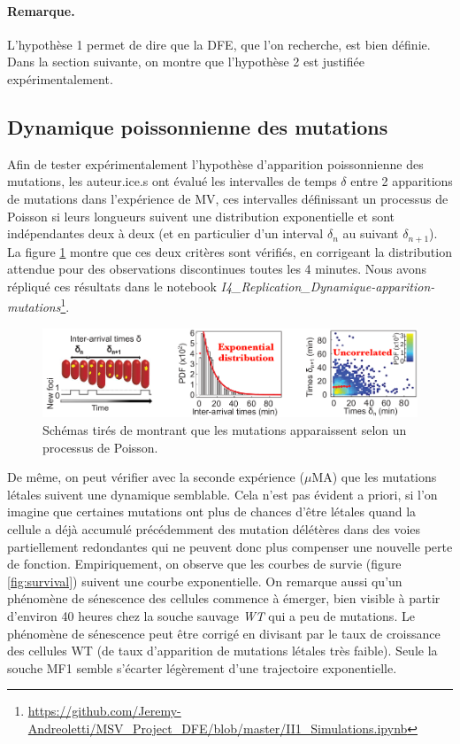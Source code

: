 \documentclass[12pt]{article}
\newcommand{\req}[1]{\paragraph{Remarque.}#1\vspace{0.1cm}}
\begin{document}
\req{L'hypothèse 1 permet de dire que la DFE, que l'on recherche, est bien définie. Dans la section suivante, on montre que l'hypothèse 2 est justifiée expérimentalement.}

\subsection{Dynamique poissonnienne des mutations}

Afin de tester expérimentalement l'hypothèse d'apparition poissonnienne des mutations, les auteur.ice.s ont évalué les intervalles de temps $\delta$ entre 2 apparitions de mutations dans l'expérience de MV, ces intervalles définissant un processus de Poisson si leurs longueurs suivent une distribution exponentielle et sont indépendantes deux à deux (et en particulier d'un interval $\delta_n$ au suivant $\delta_{n+1}$). La figure \ref{fig:iatime} montre que ces deux critères sont vérifiés, en corrigeant la distribution attendue pour des observations discontinues toutes les 4 minutes. Nous avons répliqué ces résultats dans le notebook \emph{I4\_Replication\_Dynamique-apparition-mutations}\footnote{\url{https://github.com/Jeremy-Andreoletti/MSV_Project_DFE/blob/master/II1_Simulations.ipynb}}.

\begin{figure}[h]
  \begin{center}
    \vspace{3mm}
    \includegraphics[scale=0.45]{../Img/Interarrival_times.png}
  \end{center}  
  \caption{\label{fig:iatime}Schémas tirés de \cite{rob} montrant que les mutations apparaissent selon un processus de Poisson.}
\end{figure}
\FloatBarrier

De même, on peut vérifier avec la seconde expérience ($\mu$MA) que les mutations létales suivent une dynamique semblable. Cela n'est pas évident a priori, si l'on imagine que certaines mutations ont plus de chances d'être létales quand la cellule a déjà accumulé précédemment des mutation délétères dans des voies partiellement redondantes qui ne peuvent donc plus compenser une nouvelle perte de fonction. Empiriquement, on observe que les courbes de survie (figure \ref{fig:survival}) suivent une courbe exponentielle. On remarque aussi qu'un phénomène de sénescence des cellules commence à émerger, bien visible à partir d'environ 40 heures chez la souche sauvage \emph{WT} qui a peu de mutations. Le phénomène de sénescence peut être corrigé en divisant par le taux de croissance des cellules WT (de taux d'apparition de mutations létales très faible). Seule la souche MF1 semble s'écarter légèrement d'une trajectoire exponentielle.
\end{document}
